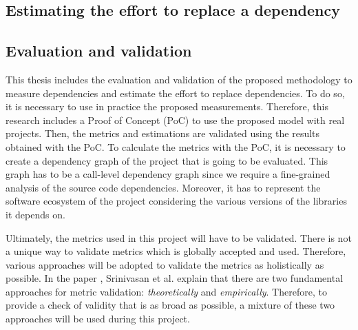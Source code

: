 \subsection{Estimating the effort to replace a dependency}

\begin{comment}
  In order to estimate the effort needed to replace a dependency in a project, there are different variables that need to be considered first:

  - How much code do I need to change - estimate based on the usage of the Dependency
  - Refactoring adjustment
  - How many methods do I need to change.
  - The impact of the change - inside the project.
\end{comment}

\subsection{Evaluation and validation} 
This thesis includes the evaluation and validation of the proposed methodology to measure dependencies and estimate the effort to replace dependencies. To do so, it is necessary to use in practice the proposed measurements. Therefore, this research includes a Proof of Concept (PoC) to use the proposed model with real projects. Then, the metrics and estimations are validated using the results obtained with the PoC.
To calculate the metrics with the PoC, it is necessary to create a dependency graph of the project that is going to be evaluated. This graph has to be a call-level dependency graph since we require a fine-grained analysis of the source code dependencies. Moreover, it has to represent the software ecosystem of the project considering the various versions of the libraries it depends on.

Ultimately, the metrics used in this project will have to be validated. There is not a unique way to validate metrics which is globally accepted and used. Therefore, various approaches will be adopted to validate the metrics as holistically as possible. In the paper \cite{srinivasan2014software}, Srinivasan et al. explain that there are two fundamental approaches for metric validation: \textit{theoretically} and \textit{empirically}. Therefore, to provide a check of validity that is as broad as possible, a mixture of these two approaches will be used during this project.


